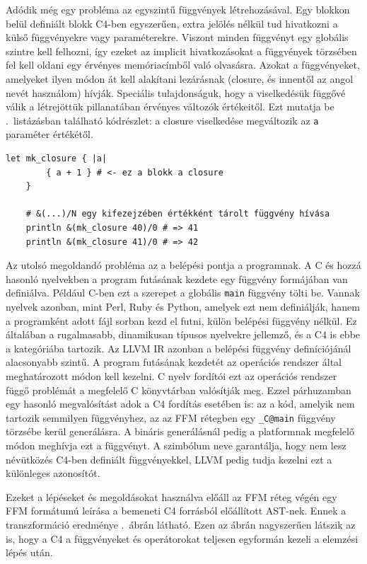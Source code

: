 Adódik még egy probléma az egyszintű függvények létrehozásával.
Egy blokkon belül definiált blokk C4-ben egyszerűen, extra jelölés nélkül tud hivatkozni a külső függvényekre vagy paraméterekre.
Viszont minden függvényt egy globális szintre kell felhozni, így ezeket az implicit hivatkozásokat a függvények törzsében fel kell oldani egy érvényes memóriacímből való olvasásra.
Azokat a függvényeket, amelyeket ilyen módon át kell alakítani lezárásnak (closure, és innentől az angol nevét használom) hívják.
Speciális tulajdonságuk, hogy a viselkedésük függővé válik a létrejöttük pillanatában érvényes változók értékeitől.
Ezt mutatja be .~listázásban található kódrészlet: a closure viselkedése megváltozik az {\tt a} paraméter értékétől.

\begin{lstlisting}[gobble=4,label=lst:closure-bhv,caption={A closure viselkedés bemutatása}]
    let mk_closure { |a|
        { a + 1 } # <- ez a blokk a closure
    }

    # &(...)/N egy kifezejzében értékként tárolt függvény hívása
    println &(mk_closure 40)/0 # => 41
    println &(mk_closure 41)/0 # => 42
\end{lstlisting}

Az utolsó megoldandó probléma az a belépési pontja a programnak.
A C és hozzá hasonló nyelvekben a program futásának kezdete egy függvény formájában van definiálva.
Például C-ben ezt a szerepet a globális {\tt main} függvény tölti be.
Vannak nyelvek azonban, mint \pl Perl, Ruby és Python, amelyek ezt nem definiálják, hanem a programként adott fájl sorban kezd el futni, külön belépési függvény nélkül.
Ez általában a rugalmasabb, dinamikusan típusos nyelvekre jellemző, és a C4 is ebbe a kategóriába tartozik.
Az LLVM \gls{IR} azonban a belépési függvény definíciójánál alacsonyabb szintű.
A program futásának kezdetét az operációs rendszer által meghatározott módon kell kezelni.
C nyelv fordítói ezt az operációs rendszer függő problémát a megfelelő C könyvtárban valósítják meg.
Ezzel párhuzamban egy hasonló megvalósítást adok a C4 fordítás esetében is: az a kód, amelyik nem tartozik semmilyen függvényhez, az az \gls{FFM} rétegben egy {\tt \_C@main} függvény törzsébe kerül generálásra.
A bináris generálásnál pedig a platformnak megfelelő módon meghívja ezt a függvényt.
A szimbólum neve garantálja, hogy nem lesz névütközés C4-ben definiált függvényekkel, LLVM pedig tudja kezelni ezt a különleges azonosítót.

Ezeket a lépéseket és megoldásokat használva előáll az \gls{FFM} réteg végén egy \gls{FFM} formátumú leírása a bemeneti C4 forrásból előállított \gls{AST}-nek.
Ennek a transzformáció eredménye .~ábrán látható.
Ezen az ábrán nagyszerűen látszik az is, hogy a C4 a függvényeket és operátorokat teljesen egyformán kezeli a elemzési lépés után.

